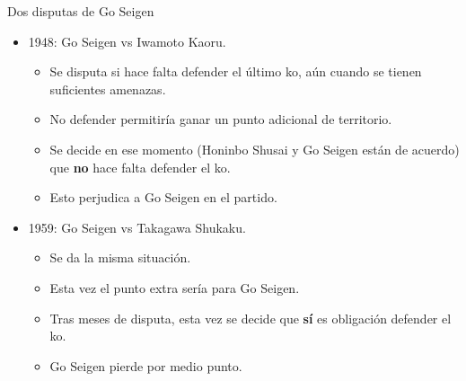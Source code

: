 \documentclass{beamer}
\begin{document}
\begin{frame}{Dos disputas de Go Seigen}
  \begin{itemize}
    \item 1948: Go Seigen vs Iwamoto Kaoru.
    \begin{itemize}
    \item Se disputa si hace falta defender el último ko, aún cuando se tienen suficientes amenazas.
    \item No defender permitiría ganar un punto adicional de territorio.
    \item Se decide en ese momento (Honinbo Shusai y Go Seigen están de acuerdo) que \textbf{no} hace falta defender el ko.
    \item Esto perjudica a Go Seigen en el partido.
    \end{itemize}
    \item 1959: Go Seigen vs Takagawa Shukaku.
    \begin{itemize}
    \item Se da la misma situación.
    \item Esta vez el punto extra sería para Go Seigen.
    \item Tras meses de disputa, esta vez se decide que \textbf{sí} es obligación defender el ko.
    \item Go Seigen pierde por medio punto.
    \end{itemize}
  \end{itemize}

\end{frame}
\end{document}
